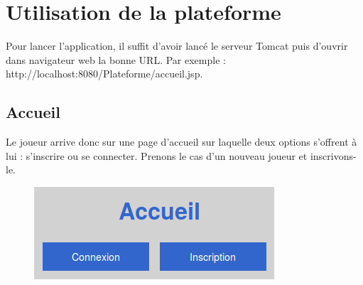 \section{Utilisation de la plateforme}
  Pour lancer l'application, il suffit d'avoir lancé le serveur Tomcat puis d'ouvrir dans navigateur web la bonne URL. Par exemple : http://localhost:8080/Plateforme/accueil.jsp.
    
  \subsection{Accueil}
  Le joueur arrive donc sur une page d'accueil sur laquelle deux options s'offrent à lui : s'inscrire ou se connecter. Prenons le cas d'un nouveau joueur et inscrivons-le.
  \begin{figure}[H]
    \center
    \includegraphics[scale=0.5]{../graph/1-accueil.png} 
  \end{figure}
    
